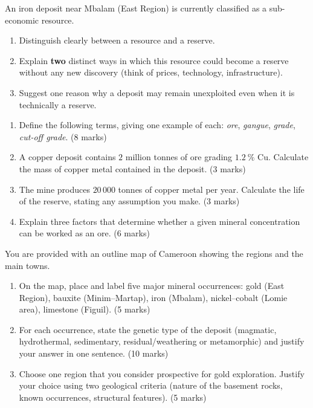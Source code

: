 \documentclass[11pt]{article}
\newcommand{\cle}[1]{{\popxbold\color{popdark}#1}}
\newcounter{popsec}
\newcounter{popsub}
\newcommand{\courssub}[1]{%
  \stepcounter{popsub}%
  \par\vspace{9pt}\noindent{\popxbold\fontsize{11.5}{13}\selectfont\color{popink}{\color{poporange}\thepopsec.\thepopsub}\hspace{6pt}#1}\par\nopagebreak\vspace{4pt}
}
\begin{document}
\begin{exercice}
An iron deposit near Mbalam (East Region) is currently classified as a sub-economic resource.
\begin{enumerate}
\item Distinguish clearly between a \cle{resource} and a \cle{reserve}.
\item Explain \textbf{two} distinct ways in which this resource could become a reserve without any new discovery (think of prices, technology, infrastructure).
\item Suggest one reason why a deposit may remain unexploited even when it is technically a reserve.
\end{enumerate}
\end{exercice}

\courssub{I prepare for the GCE}

\begin{exercice}
\begin{enumerate}
\item Define the following terms, giving one example of each: \emph{ore}, \emph{gangue}, \emph{grade}, \emph{cut-off grade}. \hfill (8 marks)
\item A copper deposit contains $2$ million tonnes of ore grading $1.2\ \%$ Cu. Calculate the mass of copper metal contained in the deposit. \hfill (3 marks)
\item The mine produces $20\,000$ tonnes of copper metal per year. Calculate the life of the reserve, stating any assumption you make. \hfill (3 marks)
\item Explain three factors that determine whether a given mineral concentration can be worked as an ore. \hfill (6 marks)
\end{enumerate}
\end{exercice}

\begin{exercice}
You are provided with an outline map of Cameroon showing the regions and the main towns.
\begin{enumerate}
\item On the map, place and label five major mineral occurrences: gold (East Region), bauxite (Minim--Martap), iron (Mbalam), nickel--cobalt (Lomie area), limestone (Figuil). \hfill (5 marks)
\item For each occurrence, state the genetic type of the deposit (magmatic, hydrothermal, sedimentary, residual/weathering or metamorphic) and justify your answer in one sentence. \hfill (10 marks)
\item Choose one region that you consider prospective for gold exploration. Justify your choice using two geological criteria (nature of the basement rocks, known occurrences, structural features). \hfill (5 marks)
\end{enumerate}
\end{exercice}
\end{document}
